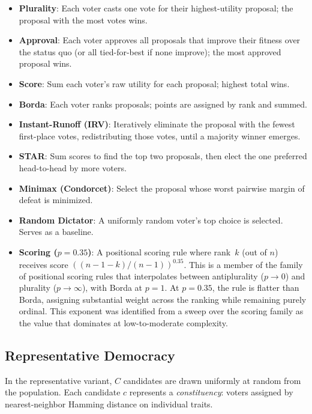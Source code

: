 \begin{itemize}
  \item \textbf{Plurality}: Each voter casts one vote for their highest-utility
    proposal; the proposal with the most votes wins.
  \item \textbf{Approval}: Each voter approves all proposals that improve their
    fitness over the status quo (or all tied-for-best if none improve); the most
    approved proposal wins.
  \item \textbf{Score}: Sum each voter's raw utility for each proposal; highest
    total wins.
  \item \textbf{Borda}: Each voter ranks proposals; points are assigned by rank
    and summed.
  \item \textbf{Instant-Runoff (IRV)}: Iteratively eliminate the proposal with
    the fewest first-place votes, redistributing those votes, until a majority
    winner emerges.
  \item \textbf{STAR}: Sum scores to find the top two proposals, then elect the
    one preferred head-to-head by more voters.
  \item \textbf{Minimax (Condorcet)}: Select the proposal whose worst pairwise
    margin of defeat is minimized.
  \item \textbf{Random Dictator}: A uniformly random voter's top choice is
    selected. Serves as a baseline.
  \item \textbf{Scoring ($p\!=\!0.35$)}: A positional scoring rule where rank~$k$
    (out of $n$) receives score $((n\!-\!1\!-\!k)/(n\!-\!1))^{0.35}$. This is a
    member of the family of positional scoring rules \citep{saari1995geometry}
    that interpolates between
    antiplurality ($p \to 0$) and plurality ($p \to \infty$), with Borda at
    $p=1$. At $p=0.35$, the rule is flatter than Borda, assigning substantial
    weight across the ranking while remaining purely ordinal. This exponent was
    identified from a sweep over the scoring family as the value that dominates
    at low-to-moderate complexity.
\end{itemize}

\subsection{Representative Democracy}

In the representative variant, $C$ candidates are drawn uniformly at random
from the population. Each candidate $c$ represents a \emph{constituency}:
voters assigned by nearest-neighbor Hamming distance on individual traits.

